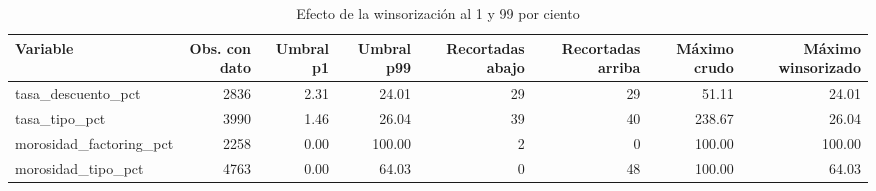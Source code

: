 \begin{table}[htbp]
\caption{Efecto de la winsorización al 1 y 99 por ciento}
\label{tab:winsor}
\begin{tabular}{lrrrrrrr}
\toprule
Variable & Obs. con dato & Umbral p1 & Umbral p99 & Recortadas abajo & Recortadas arriba & Máximo crudo & Máximo winsorizado \\
\midrule
tasa\_descuento\_pct & 2836 & 2.31 & 24.01 & 29 & 29 & 51.11 & 24.01 \\
tasa\_tipo\_pct & 3990 & 1.46 & 26.04 & 39 & 40 & 238.67 & 26.04 \\
morosidad\_factoring\_pct & 2258 & 0.00 & 100.00 & 2 & 0 & 100.00 & 100.00 \\
morosidad\_tipo\_pct & 4763 & 0.00 & 64.03 & 0 & 48 & 100.00 & 64.03 \\
\bottomrule
\end{tabular}
\end{table}
